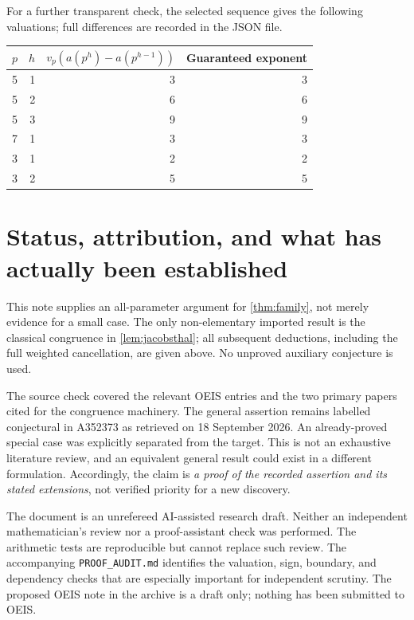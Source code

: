 \documentclass[11pt,a4paper]{article}
\numberwithin{equation}{section}
\theoremstyle{research}
\theoremstyle{definition}
\begin{document}
For a further transparent check, the selected sequence gives the
following valuations; full differences are recorded in the JSON file.
\begin{center}
\begin{tabular}{@{}rrrr@{}}
\toprule
$p$ & $h$ & $v_p(a(p^h)-a(p^{h-1}))$ & Guaranteed exponent \\
\midrule
5 & 1 & 3 & 3 \\
5 & 2 & 6 & 6 \\
5 & 3 & 9 & 9 \\
7 & 1 & 3 & 3 \\
3 & 1 & 2 & 2 \\
3 & 2 & 5 & 5 \\
\bottomrule
\end{tabular}
\end{center}

\section{Status, attribution, and what has actually been established}
\label{sec:status}
This note supplies an all-parameter argument for
\cref{thm:family}, not merely evidence for a small case. The only
non-elementary imported result is the classical congruence in
\cref{lem:jacobsthal}; all subsequent deductions, including the full
weighted cancellation, are given above. No unproved auxiliary
conjecture is used.

The source check covered the relevant OEIS entries and the two primary
papers cited for the congruence machinery. The general assertion remains
labelled conjectural in A352373 as retrieved on 18 September 2026.
An already-proved special case was explicitly separated from the target.
This is not an exhaustive literature review, and an equivalent general
result could exist in a different formulation. Accordingly, the claim is
\emph{a proof of the recorded assertion and its stated extensions}, not
verified priority for a new discovery.

The document is an unrefereed AI-assisted research draft. Neither an
independent mathematician's review nor a proof-assistant check was
performed. The arithmetic tests are reproducible but cannot replace
such review. The accompanying \texttt{PROOF\_AUDIT.md} identifies the
valuation, sign, boundary, and dependency checks that are especially
important for independent scrutiny. The proposed OEIS note in the
archive is a draft only; nothing has been submitted to OEIS.
\end{document}
